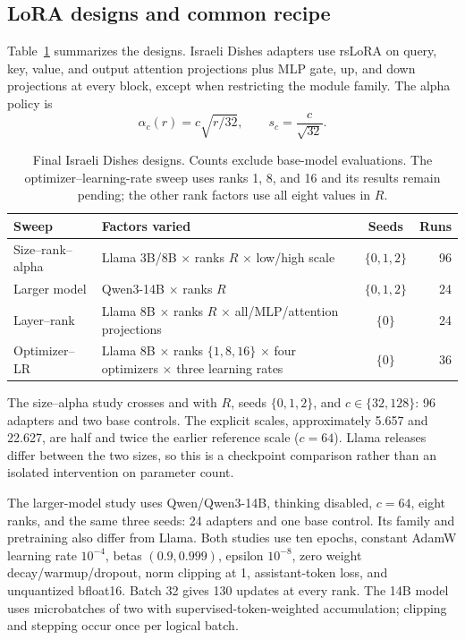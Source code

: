 \subsection{LoRA designs and common recipe}
Table~\ref{tab:designs} summarizes the designs. Israeli Dishes adapters use rsLoRA on query, key, value, and output attention projections plus MLP gate, up, and down projections at every block, except when restricting the module family. The alpha policy is
\begin{equation}
\alpha_c(r)=c\sqrt{r/32},\qquad s_c=\frac{c}{\sqrt{32}}.
\label{eq:scale}
\end{equation}
\begin{table}[t]
\centering
\small
\setlength{\tabcolsep}{4pt}
\renewcommand{\arraystretch}{1.15}
\begin{tabular}{p{3.0cm}p{8.8cm}cr}
\toprule
\textbf{Sweep} & \textbf{Factors varied} & \textbf{Seeds} & \textbf{Runs} \\
\midrule
Size--rank--alpha & Llama 3B/8B $\times$ ranks $R$ $\times$ low/high scale & $\{0,1,2\}$ & 96 \\
Larger model & Qwen3-14B $\times$ ranks $R$ & $\{0,1,2\}$ & 24 \\
Layer--rank & Llama 8B $\times$ ranks $R$ $\times$ all/MLP/attention projections & $\{0\}$ & 24 \\
Optimizer--LR & Llama 8B $\times$ ranks $\{1,8,16\}$ $\times$ four optimizers $\times$ three learning rates & $\{0\}$ & 36 \\
\bottomrule
\end{tabular}
\caption{Final Israeli Dishes designs. Counts exclude base-model evaluations. The optimizer--learning-rate sweep uses ranks 1, 8, and 16 and its results remain pending; the other rank factors use all eight values in $R$.}
\label{tab:designs}
\end{table}

The size--alpha study crosses \modelsmall{} and \modelbase{} with $R$, seeds $\{0,1,2\}$, and $c\in\{32,128\}$: 96 adapters and two base controls. The explicit scales, approximately 5.657 and 22.627, are half and twice the earlier reference scale ($c=64$). Llama releases differ between the two sizes, so this is a checkpoint comparison rather than an isolated intervention on parameter count.

The larger-model study uses Qwen/Qwen3-14B, thinking disabled, $c=64$, eight ranks, and the same three seeds: 24 adapters and one base control. Its family and pretraining also differ from Llama. Both studies use ten epochs, constant AdamW learning rate $10^{-4}$, betas $(0.9,0.999)$, epsilon $10^{-8}$, zero weight decay/warmup/dropout, norm clipping at 1, assistant-token loss, and unquantized bfloat16. Batch 32 gives 130 updates at every rank. The 14B model uses microbatches of two with supervised-token-weighted accumulation; clipping and stepping occur once per logical batch.

